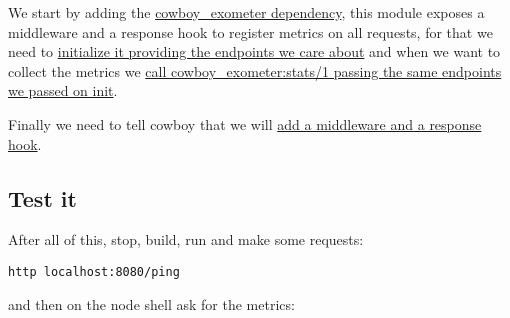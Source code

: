 \documentclass[letterpaper,10pt,english]{sphinxmanual}
\begin{document}
We start by adding the \href{https://github.com/marianoguerra/tanodb/commit/8fb792bc01ac58fbdc709a0c9d2f960605255e54\#diff-31d7a50c99c265ca2793c20961b60979R7}{cowboy\_exometer dependency}, this module exposes a middleware and a response hook
to register metrics on all requests, for that we need to \href{https://github.com/marianoguerra/tanodb/commit/8fb792bc01ac58fbdc709a0c9d2f960605255e54\#diff-afa3f67ec87f742d64ee9ed311455777R20}{initialize it providing the endpoints we care about} and when we want to collect the metrics we \href{https://github.com/marianoguerra/tanodb/commit/8fb792bc01ac58fbdc709a0c9d2f960605255e54\#diff-afa3f67ec87f742d64ee9ed311455777R11}{call cowboy\_exometer:stats/1 passing the same endpoints we passed on init}.

Finally we need to tell cowboy that we will \href{https://github.com/marianoguerra/tanodb/commit/8fb792bc01ac58fbdc709a0c9d2f960605255e54\#diff-4477d4dd0aa2db0e274a56c9158207bdR38}{add a middleware and a response hook}.


\subsection{Test it}
\label{metrics:id2}
After all of this, stop, build, run and make some requests:

\begin{Verbatim}[commandchars=\\\{\}]
http localhost:8080/ping
\end{Verbatim}

and then on the node shell ask for the metrics:
\end{document}
